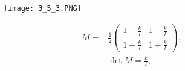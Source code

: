\begin{figure}[ht]
    \begin{minipage}{0.5\textwidth}
        \centering
        \texttt{[image: 3\_5\_3.PNG]}
    \end{minipage}
    \begin{minipage}{0.5\textwidth}
        \begin{equation}
            \begin{aligned}
                M = &\frac{1}{2}\left(\begin{array}{cc}{1+\frac{k}{l}} & {1-\frac{k}{l}}\\{1-\frac{k}{l}}&{1+\frac{k}{l}}
                \end{array}\right),
                \\& \operatorname{det}M=\frac{k}{l},
            \end{aligned}
        \end{equation}
    \end{minipage}
\end{figure}

